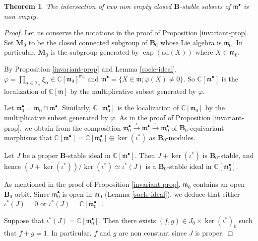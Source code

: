 \documentclass[10pt,a4paper]{amsart}
\newcommand{\soc}[1]{\mathcal{I}_{#1}}
\newcommand{\group}[1]{\mathbf{#1}}
\numberwithin{equation}{section}
\theoremstyle{plain}
\newtheorem{theorem}{Theorem}[section]
\theoremstyle{definition}
\theoremstyle{remark}
\begin{document}
\begin{theorem}\label{intersection-theorem}
The intersection of two non empty closed $\group{B}$-stable subsets of $\mathfrak{m}^{\bullet}$
is non empty.
\end{theorem}

\begin{proof}
Let us conserve the notations in the proof of Proposition \ref{invariant-prop}.
Set $\group{M}_{0}$  to be the closed connected subgroup
of $\group{B}_{0}$ whose Lie algebra is $\mathfrak{m}_{0}$.
In particular, $\group{M}_{0}$ is the subgroup generated by $\exp (\mathrm{ad} (X))$
where $X\in \mathfrak{m}_{0}$.

By Proposition \ref{invariant-prop} and Lemma \ref{socle-ideal}, $\varphi = \prod_{\alpha \in \soc{\mathfrak{m}}} \xi_{\alpha} \in 
\mathbb{C}[\mathfrak{m}_{0}]^{\mathfrak{m}_{0}}$
and $\mathfrak{m}^{\bullet} = \{ X \in \mathfrak{m} ; \varphi (X) \neq 0\}$. 
So
$\mathbb{C}[\mathfrak{m}^{\bullet}]$ is the localization
of $\mathbb{C}[\mathfrak{m}]$ by the multiplicative subset generated by $\varphi$.

Let $\mathfrak{m}_{0}^{\bullet} = \mathfrak{m}_{0} \cap \mathfrak{m}^{\bullet}$. Similarly, 
$\mathbb{C}[\mathfrak{m}_{0}^{\bullet} ]$  is the localization 
of $\mathbb{C}[\mathfrak{m}_{0}]$ by the multiplicative subset generated by $\varphi$.
As in the proof of Proposition \ref{invariant-prop}, we obtain from the composition 
$
\mathfrak{m}_{0}^{\bullet} \stackrel{\iota}{\rightarrow} \mathfrak{m}^{\bullet} 
\stackrel{\pi}{\rightarrow} \mathfrak{m}_{0}^{\bullet}
$
of $\group{B}_{0}$-equivariant morphisms that 
$
\mathbb{C}[\mathfrak{m}^{\bullet} ]= \mathbb{C}[\mathfrak{m}_{0}^{\bullet} ]
\oplus \ker (\iota^{*})
$
as $\group{B}_{0}$-modules. 

Let $J$ be a proper $\group{B}$-stable ideal in $\mathbb{C}[\mathfrak{m}^{\bullet} ]$.
Then $J + \ker (\iota^{*})$ is $\group{B}_{0}$-stable, and hence
$
(J + \ker (\iota^{*}) ) /  \ker (\iota^{*}) \simeq \iota^{*} ( J )
$
is a $\group{B}_{0}$-stable ideal in $\mathbb{C}[\mathfrak{m}_{0}^{\bullet} ]$.

As mentioned in the proof of Proposition \ref{invariant-prop},
$\mathfrak{m}_{0}$ contains an open $\group{B}_{0}$-orbit. Since $\mathfrak{m}_{0}^{\bullet}$
is open in $\mathfrak{m}_{0}$ (Lemma \ref{socle-ideal}), we deduce that either $\iota^{*} ( J ) = 0$ or 
$\iota^{*} ( J ) = \mathbb{C}[\mathfrak{m}_{0}^{\bullet} ]$.

Suppose that $\iota^{*} ( J ) = \mathbb{C}[\mathfrak{m}_{0}^{\bullet} ]$.
Then there exists $(f,g) \in J_{0} \times \ker (\iota^{*})_{0}$ such that 
$f+g =1$. In particular, $f$ and $g$ are non constant since $J$ is proper.


\end{proof}
\end{document}
